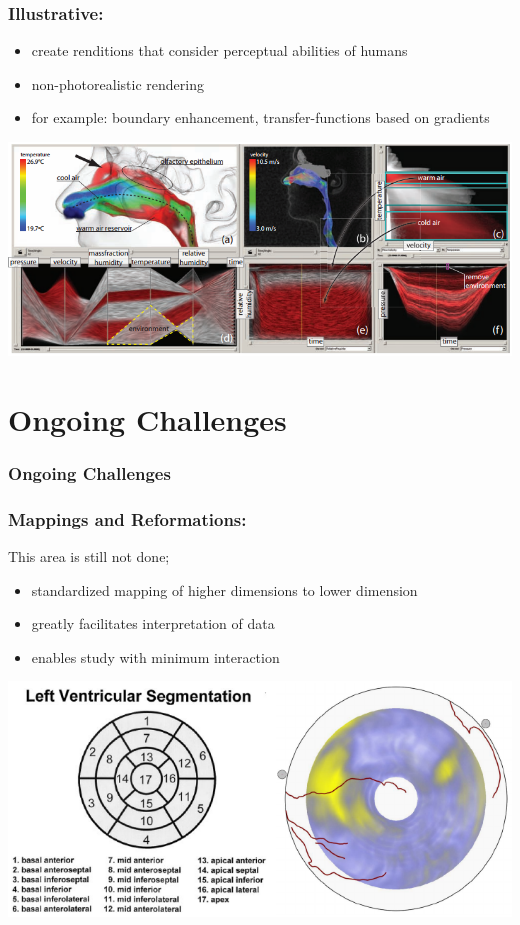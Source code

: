 \documentclass{beamer}
\begin{document}
\begin{frame}
	\frametitle{Illustrative:} %
	\begin{itemize}
		\item create renditions that consider perceptual abilities of humans
		\item non-photorealistic rendering
		\item for example: boundary enhancement, transfer-functions based on
gradients
	\end{itemize}
	\includegraphics[width=\textwidth]{images/nose}
%
\end{frame}

\section{Ongoing Challenges}

\begin{frame}
	\frametitle{Ongoing Challenges}
\end{frame}

\begin{frame}
	\frametitle{Mappings and Reformations:}
		This area is still not done;
	\begin{itemize}
		\item standardized mapping of higher dimensions to lower dimension
		\item greatly facilitates interpretation of data
		\item enables study with minimum interaction
	\end{itemize}
	\includegraphics[width=\textwidth]{images/heart}
\end{frame}
\end{document}
